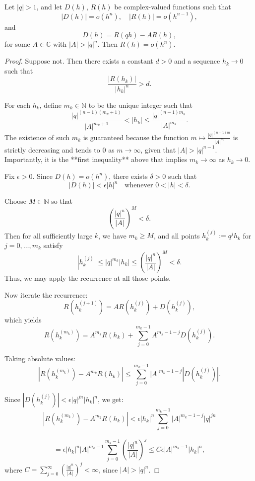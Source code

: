 \documentclass[10pt,a4paper]{amsart}
\begin{document}
\begin{theorem}\label{th2}
Let \( |q| > 1 \), and let \( D(h) \), \( R(h) \) be complex-valued functions such that
\[
|D(h)| = o(h^n), \quad |R(h)| = o(h^{n-1}),
\]
and
\[
D(h) = R(qh) - A R(h),
\]
for some \( A \in \mathbb{C} \) with \( |A| > |q|^n \). Then \( R(h) = o(h^n) \).
\end{theorem}

\begin{proof}
Suppose not. Then there exists a constant \( d > 0 \) and a sequence \( h_k \to 0 \) such that
\[
\frac{|R(h_k)|}{|h_k|^n} > d.
\]

For each \( h_k \), define \( m_k \in \mathbb{N} \) to be the unique integer such that
\[
\frac{|q|^{(n-1)(m_k+1)}}{|A|^{m_k+1}} < |h_k| \leq \frac{|q|^{(n-1)m_k}}{|A|^{m_k}}.
\]
The existence of such \( m_k \) is guaranteed because the function \( m \mapsto \frac{|q|^{(n-1)m}}{|A|^m} \) is strictly decreasing and tends to 0 as \( m \to \infty \), given that \( |A| > |q|^{n-1} \). Importantly, it is the **first inequality** above that  implies \( m_k \to \infty \) as \( h_k \to 0 \).

Fix \( \epsilon > 0 \). Since \( D(h) = o(h^n) \), there exists \( \delta > 0 \) such that
\[
|D(h)| < \epsilon |h|^n \quad \text{whenever } 0 < |h| < \delta.
\]

Choose \( M \in \mathbb{N} \) so that
\[
\left( \frac{|q|^n}{|A|} \right)^M < \delta.
\]
Then for all sufficiently large \( k \), we have \( m_k \geq M \), and all points \( h_k^{(j)} := q^j h_k \) for \( j = 0, \dots, m_k \) satisfy
\[
|h_k^{(j)}| \leq |q|^{m_k} |h_k| \leq \left( \frac{|q|^n}{|A|} \right)^M < \delta.
\]
Thus, we may apply the recurrence at all those points.

Now iterate the recurrence:
\[
R(h_k^{(j+1)}) = A R(h_k^{(j)}) + D(h_k^{(j)}),
\]
which yields
\[
R(h_k^{(m_k)}) = A^{m_k} R(h_k) + \sum_{j=0}^{m_k - 1} A^{m_k - 1 - j} D(h_k^{(j)}).
\]

Taking absolute values:
\[
\left| R(h_k^{(m_k)}) - A^{m_k} R(h_k) \right| \leq \sum_{j=0}^{m_k - 1} |A|^{m_k - 1 - j} |D(h_k^{(j)})|.
\]

Since \( |D(h_k^{(j)})| < \epsilon |q|^{jn} |h_k|^n \), we get:
\[
\left| R(h_k^{(m_k)}) - A^{m_k} R(h_k) \right|
< \epsilon |h_k|^n \sum_{j=0}^{m_k - 1} |A|^{m_k - 1 - j} |q|^{jn}
\]

\[
= \epsilon |h_k|^n |A|^{m_k - 1} \sum_{j=0}^{m_k - 1} \left( \frac{|q|^n}{|A|} \right)^j
\leq C \epsilon |A|^{m_k - 1} |h_k|^n,
\]
where \( C = \sum_{j=0}^{\infty} \left( \frac{|q|^n}{|A|} \right)^j < \infty \), since \( |A| > |q|^n \).


\end{proof}
\end{document}
